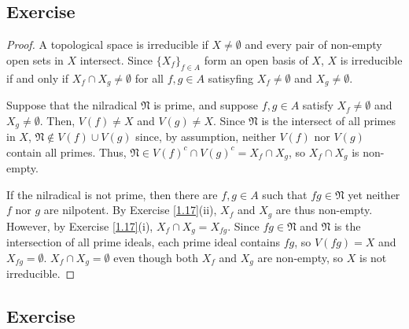 \subsection{Exercise}\label{1.19}

\begin{proof}
A topological space is irreducible if $X \neq \emptyset$ and every pair of non-empty open sets in $X$ intersect. Since $\{X_f\}_{f \in A}$ form an open basis of $X$, 
$X$ is irreducible if and only if $X_f \cap X_g \neq \emptyset$ for all $f,g \in A$ satisyfing $X_f \neq \emptyset$ and $X_g \neq \emptyset$.

Suppose that the nilradical $\mathfrak{N}$ is prime, and suppose $f,g \in A$ satisfy $X_f \neq \emptyset$ and $X_g \neq \emptyset$. Then, 
$V(f) \neq X$ and $V(g) \neq X$. Since $\mathfrak{N}$ is the intersect of all primes in $X$, $\mathfrak{N} \not\in V(f) \cup V(g)$ since, by assumption, 
neither $V(f)$ nor $V(g)$ contain all primes. Thus, $\mathfrak{N} \in V(f)^c \cap V(g)^c = X_f \cap X_g$, so $X_f \cap X_g$ is non-empty.

If the nilradical is not prime, then there are $f,g \in A$ such that $fg \in \mathfrak{N}$ yet neither $f$ nor $g$ are nilpotent. By Exercise \ref{1.17}(ii),
$X_f$ and $X_g$ are thus non-empty. However, by Exercise \ref{1.17}(i), $X_f \cap X_g = X_{fg}$. Since $fg \in \mathfrak{N}$ and $\mathfrak{N}$ is the intersection
of all prime ideals, each prime ideal contains $fg$, so $V(fg) = X$ and $X_{fg} = \emptyset$. $X_f \cap X_g = \emptyset$ even though both
$X_f$ and $X_g$ are non-empty, so $X$ is not irreducible.
\end{proof}

\subsection{Exercise}\label{1.20}

